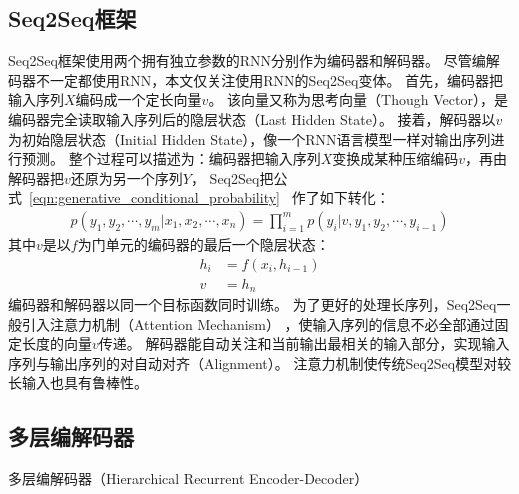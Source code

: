 \subsection{Seq2Seq框架}\label{subsec:Seq2Seq}
Seq2Seq框架使用两个拥有独立参数的RNN分别作为编码器和解码器。
尽管编解码器不一定都使用RNN，本文仅关注使用RNN的Seq2Seq变体。
首先，编码器把输入序列$X$编码成一个定长向量$v$。
该向量又称为思考向量（Though Vector），是编码器完全读取输入序列后的隐层状态（Last Hidden State）。
接着，解码器以$v$为初始隐层状态（Initial Hidden State），像一个RNN语言模型一样对输出序列进行预测。
整个过程可以描述为：编码器把输入序列$X$变换成某种压缩编码$v$，再由解码器把$v$还原为另一个序列$Y$，
Seq2Seq把公式~\ref{eqn:generative_conditional_probability}~
作了如下转化：
\begin{align}
    p(y_1, y_2, \cdots, y_m|x_1, x_2, \cdots, x_n) = \prod_{i=1}^m p(y_i|v, y_1, y_2, \cdots, y_{i-1})
\end{align}
其中$v$是以$f$为门单元的编码器的最后一个隐层状态：
\begin{align}
    h_i &= f(x_i ,h_{i-1}) \\
    v &= h_n
\end{align}
编码器和解码器以同一个目标函数同时训练。
为了更好的处理长序列，Seq2Seq一般引入注意力机制（Attention Mechanism）
，使输入序列的信息不必全部通过固定长度的向量$v$传递。
解码器能自动关注和当前输出最相关的输入部分，实现输入序列与输出序列的对自动对齐（Alignment）。
注意力机制使传统Seq2Seq模型对较长输入也具有鲁棒性。

\subsection{多层编解码器}\label{subsec:hierarchical_rnn}
多层编解码器（Hierarchical Recurrent Encoder-Decoder）

